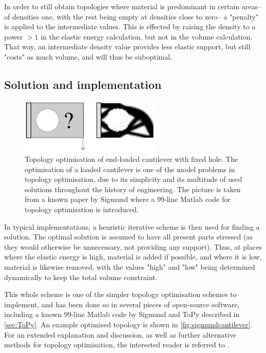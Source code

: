 In order to still obtain topologies where material is predominant in certain areas-- of densities one, with the rest being empty at densities close to zero-- a "penalty" is applied to the intermediate values. This is effected by raising the density to a power $> 1$ in the elastic energy calculation, but not in the volume calculation. That way, an intermediate density value provides less elastic support, but still "costs" as much volume, and will thus be suboptimal. 

\subsection{Solution and implementation}
\begin{figure}
\centering
\includegraphics[width=0.6\textwidth]{Pictures/TopOp/Sigmund_cantilever2d.png}
\caption{Topology optimisation of end-loaded cantilever with fixed hole. The optimisation of a loaded cantilever is one of the model problems in topology optimisation, due to its simplicity and its multitude of used solutions throughout the history of engineering. The picture is taken from a known paper by Sigmund \cite{sigmund200199} where a 99-line Matlab code for topology optimisation is introduced.} 
\label{fig:sigmundcantilever}
\end{figure}
In typical implementations, a heuristic iterative scheme is then used for finding a solution. The optimal solution is assumed to have all present parts stressed (as they would otherwise be unnecessary, not providing any support). Thus, at places where the elastic energy is high, material is added if possible, and where it is low, material is likewise removed, with the values "high" and "low" being determined dynamically to keep the total volume constraint. 

This whole scheme is one of the simpler topology optimisation schemes to implement, and has been done so in several pieces of open-source software, including a known 99-line Matlab code by Sigmund \cite{sigmund200199} and ToPy described in \autoref{sec:ToPy}. An example optimised topology is shown in \autoref{fig:sigmundcantilever}. For an extended explanation and discussion, as well as further alternative methods for topology optimisation, the interested reader is referred to \cite{bendsoe2003topology}.

